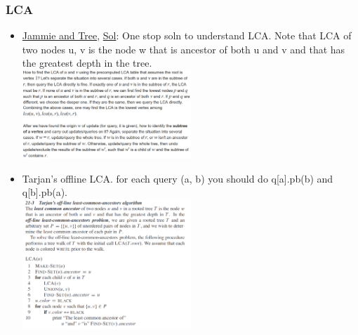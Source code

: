 \documentclass[8pt, a4paper, oneside, twocolumn]{extarticle}
\begin{document}
\subsubsection{LCA}
\begin{itemize}[leftmargin=*]
    \item \href {https://codeforces.com/contest/916/problem/E}{Jammie and Tree}, \href {https://github.com/sourabh2311/Competitive-Programming/blob/master/CF/457D2/E.cpp}{Sol}: One stop soln to understand LCA. Note that LCA of two nodes u, v is the node w that is ancestor of both u and v and that has the greatest depth in the tree.\\\includegraphics[width=0.5\textwidth,height=0.5\textheight,keepaspectratio]{lca}
    \item Tarjan's offline LCA. for each query (a, b) you should do q[a].pb(b) and q[b].pb(a).
\\\includegraphics[width=0.5\textwidth,height=0.5\textheight,keepaspectratio]{tar}
\end{itemize}
\end{document}

